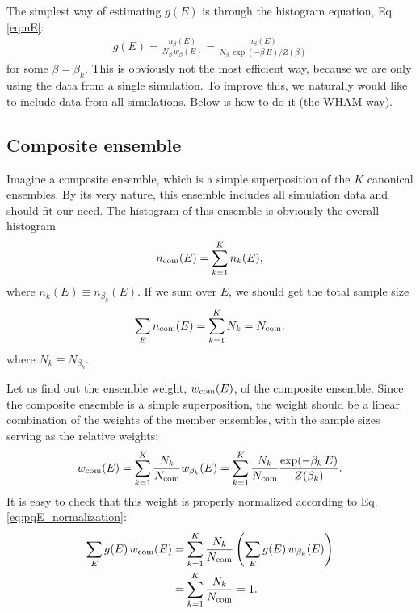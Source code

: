\documentclass[aip,jcp,preprint,superscriptaddress]{revtex4-1}
\begin{document}
The simplest way
of estimating $g(E)$ is through the histogram equation,
Eq. \eqref{eq:nE}:
%
\begin{align}
\hat g(E)
=
\frac{ n_\beta(E) }
{ N_\beta \, w_\beta(E) }
=
\frac{ n_\beta(E) }
{ N_\beta \, \exp(-\beta \, E) / Z(\beta) }
\label{eq:gE_onehistogram}
\end{align}
for some $\beta = \beta_k$.
%
This is obviously not the most efficient way,
because we are only using the data
from a single simulation.
%
To improve this,
we naturally would like to include data
from all simulations.
%
Below is how to do it (the WHAM way).





\subsection{Composite ensemble}



Imagine a composite ensemble,
which is a simple superposition of
the $K$ canonical ensembles.
%
By its very nature,
this ensemble includes all simulation data
and should fit our need.
%
The histogram of this ensemble
is obviously the overall histogram
%
\begin{equation}
  n_{\mathrm{com}}(E)
=
  \sum_{k = 1}^K n_k(E),
  \label{eq:ncom_def}
\end{equation}
%
where $n_k(E) \equiv n_{\beta_k}(E)$.
%
If we sum over $E$,
we should get the total sample size
%
\begin{equation}
\sum_E n_{\mathrm{com}}(E)
=
\sum_{k = 1}^K N_k
=
N_{\mathrm{com}}.
\label{eq:ncom_sum}
\end{equation}
%
where $N_k \equiv N_{\beta_k}$.



Let us find out the ensemble weight, $w_{\mathrm{com}}(E)$,
of the composite ensemble.
%
Since the composite ensemble is a simple superposition,
the weight should be a linear combination
of the weights of the member ensembles,
with the sample sizes serving as the relative weights:
%
\begin{equation}
w_{\mathrm{com}}(E)
=
\sum_{k = 1}^K
\frac{ N_k } { N_{\mathrm{com}} }
w_{\beta_k}(E)
=
\sum_{k = 1}^K
\frac{ N_k } { N_{\mathrm{com}} }
\frac{ \exp( -\beta_k \, E ) } { Z(\beta_k) }.
\end{equation}
%
It is easy to check that this weight is properly normalized
according to Eq. \eqref{eq:pqE_normalization}:
%
\begin{align*}
\sum_E g(E) \, w_{\mathrm{com}}(E)
&=
\sum_{k = 1}^K
\frac{ N_k } { N_{\mathrm{com}} }
\left(
  \sum_E g(E) \, w_{\beta_k}(E)
\right)
\\
&=
\sum_{k = 1}^K
\frac{ N_k } { N_{\mathrm{com}} }
=1.
\end{align*}
\end{document}
